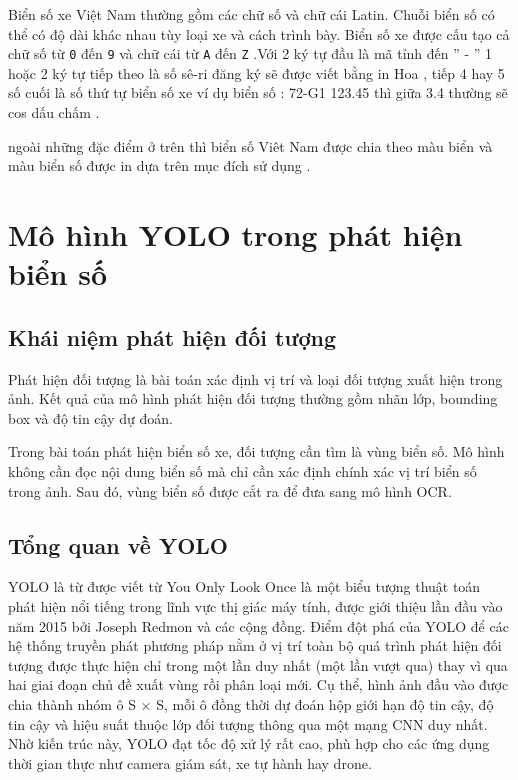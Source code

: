 \documentclass[13pt,a4paper]{report}
\begin{document}
Biển số xe Việt Nam thường gồm các chữ số và chữ cái Latin. Chuỗi biển số có thể có độ dài khác nhau tùy loại xe và cách trình bày. Biển số xe được cấu tạo cả chữ số từ \texttt{0} đến \texttt{9} và chữ cái từ \texttt{A} đến \texttt{Z} .Với 2 ký tự đầu là mã tỉnh đến '' - ''  1 hoặc 2 ký tự tiếp theo là số sê-ri đăng ký sẽ được viết bằng in Hoa , tiếp 4 hay 5 số cuối là số thứ tự biển số xe ví dụ biển số : 72-G1 123.45 thì giữa 3.4 thường sẽ cos dấu chấm .

ngoài những đặc điểm ở trên thì biển số Viêt Nam được chia theo màu biển và màu biển số được in dựa trên mục đích sử dụng .


\section{Mô hình YOLO trong phát hiện biển số}

\subsection{Khái niệm phát hiện đối tượng}

Phát hiện đối tượng là bài toán xác định vị trí và loại đối tượng xuất hiện trong ảnh. Kết quả của mô hình phát hiện đối tượng thường gồm nhãn lớp, bounding box và độ tin cậy dự đoán.

Trong bài toán phát hiện biển số xe, đối tượng cần tìm là vùng biển số. Mô hình không cần đọc nội dung biển số mà chỉ cần xác định chính xác vị trí biển số trong ảnh. Sau đó, vùng biển số được cắt ra để đưa sang mô hình OCR.

\subsection{Tổng quan về YOLO}

YOLO là từ được viết từ You Only Look Once là một biểu tượng thuật toán phát hiện nổi tiếng trong lĩnh vực thị giác máy tính, được giới thiệu lần đầu vào năm 2015 bởi Joseph Redmon và các cộng đồng. Điểm đột phá của YOLO để các hệ thống truyền phát phương pháp nằm ở vị trí toàn bộ quá trình phát hiện đối tượng được thực hiện chỉ trong một lần duy nhất (một lần vượt qua) thay vì qua hai giai đoạn chủ đề xuất vùng rồi phân loại mới. Cụ thể, hình ảnh đầu vào được chia thành nhóm ô S × S, mỗi ô đồng thời dự đoán hộp giới hạn độ tin cậy, độ tin cậy và hiệu suất thuộc lớp đối tượng thông qua một mạng CNN duy nhất. Nhờ kiến ​​trúc này, YOLO đạt tốc độ xử lý rất cao, phù hợp cho các ứng dụng thời gian thực như camera giám sát, xe tự hành hay drone.
\end{document}
